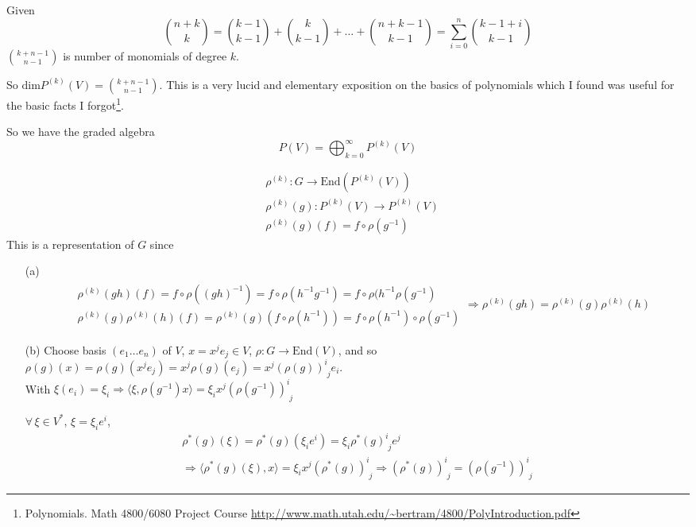 \documentclass[10pt]{amsart}
\begin{document}
\begin{multicols*}{2}
Given 
\[
\binom{n+k}{k} = \binom{k-1}{k-1} + \binom{k}{k-1} + \dots + \binom{n+k-1}{k-1} = \sum_{i=0}^n \binom{k-1+i}{k-1}
\]
$\binom{k+n-1}{n-1}$ is number of monomials of degree $k$.  

So $\text{dim}P^{(k)}(V) = \binom{k+n-1}{n-1}$.   This is a very lucid and elementary exposition on the basics of polynomials which I found was useful for the basic facts I forgot\footnote{Polynomials. Math 4800/6080 Project Course \url{http://www.math.utah.edu/~bertram/4800/PolyIntroduction.pdf}}.

So we have the graded algebra
\[
P(V) = \bigoplus_{k=0}^{\infty} P^{(k)}(V)
\]

\[
\begin{aligned}
  & \rho^{(k)}: G \to \text{End}(P^{(k)}(V)) \\ 
  & \rho^{(k)}(g): P^{(k)}(V) \to P^{(k)}(V) \\ 
  & \rho^{(k)}(g)(f) = f\circ \rho(g^{-1})
\end{aligned}
\]
This is a representation of $G$ since 
\begin{enumerate}
\item[(a)] 
\[
\begin{gathered}
  \begin{aligned}
    & \rho^{(k)}(gh)(f) = f\circ \rho((gh)^{-1}) = f\circ \rho(h^{-1}g^{-1}) = f\circ \rho(h^{-1}\rho(g^{-1}) \\ 
    & \rho^{(k)}(g) \rho^{(k)}(h)(f) = \rho^{(k)}(g) (f\circ \rho(h^{-1})) = f\circ \rho(h^{-1})\circ \rho(g^{-1})
\end{aligned} \Longrightarrow \rho^{(k)}(gh) = \rho^{(k)}(g) \rho^{(k)}(h)
\end{gathered}
\]


\item[(b)]
Choose basis $(e_1 \dots e_n)$ of $V$, $x = x^j e_j \in V$, $\rho : G \to \text{End}(V)$, and so $\rho(g)(x) = \rho(g)(x^je_j) = x^j\rho(g)(e_j)= x^j(\rho(g))^i_{ \,\, j} e_i$.  \\
With $\xi(e_i) = \xi_i \Longrightarrow \langle \xi, \rho(g^{-1})x\rangle = \xi_i x^j (\rho(g^{-1}))^i_{ \,\, j}$

$\forall \, \xi \in V^*$, $\xi = \xi_i e^i$, 
\[
\begin{gathered}
  \rho^*(g)(\xi) = \rho^*(g)(\xi_i e^i) = \xi_i \rho^*(g)^i_{\,\,j} e^j \\ 
\Longrightarrow   \langle \rho^*(g)(\xi), x \rangle = \xi_i x^j (\rho^*(g))^i_{ \,\,j} \Longrightarrow (\rho^*(g))^i_{\,\,j} = (\rho(g^{-1}))^i_{ \,\, j} 
\end{gathered}
\]


\end{enumerate}
\end{multicols*}
\end{document}
